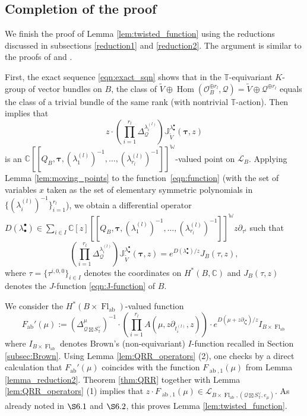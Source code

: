 \documentclass[a4paper,12pt]{amsart}
\numberwithin{equation}{section}
\theoremstyle{definition}
\newcommand{\C}{\mathbb{C}}
\newcommand{\J}{\mathbb{J}}
\newcommand{\T}{\mathbb{T}}
\newcommand{\W}{\mathbb{W}}
\newcommand{\btau}{{\bm{\tau}}}
\newcommand{\cL}{\mathcal{L}}
\newcommand{\Fab}{F_{\operatorname{ab}}}
\newcommand{\FlT}{\operatorname{Fl}_{\operatorname{ab}}}
\begin{document}
\subsection{Completion of the proof}\label{subsec:finish}
We finish the proof of Lemma \ref{lem:twisted_function} using the reductions discussed in subsections \ref{reduction1} and \ref{reduction2}.
The argument is similar to the proofs of \cite[Theorem 3.3]{IK:quantum} and \cite[Theorem 5.1]{Koto:mirror}.

First, the exact sequence \eqref{eqn:exact_sqn} shows that in the $\T$-equivariant $K$-group of vector bundles on $B$, the class of $\widetilde{V} \oplus \operatorname{Hom}(\mathcal{O}_B^{\oplus r_l},\mathcal{Q})=\widetilde{V} \oplus \mathcal{Q}^{\oplus r_l}$ equals the class of a trivial bundle of the same rank (with nontrivial $\T$-action). Then \cite[Lemma 2.9]{Koto:mirror} implies that
\begin{equation}\label{eqn:function}
    z \cdot \left( \prod_{i=1}^{r_l} \Delta_{\mathcal{Q}}^{\lambda_i^{(l)}} \right) \J_{\widetilde{V}}^{\lambda_\bullet^\bullet}(\btau,z)
\end{equation}
is an $\C[\![Q_B,\btau,(\lambda^{(l)}_1)^{-1},\dots,(\lambda^{(l)}_{r_l})^{-1}]\!]^\W$-valued point on $\cL_B$.
Applying Lemma \ref{lem:moving_points} to the function~\eqref{eqn:function} (with the set of variables $x$ taken as the set of elementary symmetric polynomials in $\{(\lambda^{(l)}_i)^{-1}\}_{i=1}^{r_l}$), we obtain a differential operator $D(\lambda_\bullet^\bullet)\in\sum_{i\in I}\C[z][\![Q_B,\btau,(\lambda^{(l)}_1)^{-1},\dots,(\lambda^{(l)}_{r_l})^{-1}]\!]^\W z\partial_{\tau^i}$ such that
\[
\left( \prod_{i=1}^{r_l} \Delta_{\mathcal{Q}}^{\lambda_i^{(l)}} \right) \J_{\widetilde{V}}^{\lambda_\bullet^\bullet}(\btau,z) = e^{D(\lambda^\bullet_\bullet)/z}J_B(\tau,z),
\]
where $\tau=\{\tau^{i,0,0}\}_{i\in I}$ denotes the coordinates on $H^*(B,\C)$ and $J_B(\tau,z)$ denotes the $J$-function \eqref{eqn:J-function} of $B$.


We consider the $H^*(B\times\FlT)$-valued function 
\[\Fab'(\mu):=
\left(\Delta_{\mathcal{Q}\boxtimes S_\T^\vee}^\mu\right)^{-1} \cdot 
\left( \prod_{i=1}^{r_l}  {A(\mu,z\partial_{t^{(l)}_i},z)} \right) \cdot  e^{D(\mu+z\partial_{t_\bullet^\bullet})/z} I_{B\times\FlT} 
\]
where $I_{B\times\FlT}$ denotes Brown's (non-equivariant) $I$-function recalled in Section \ref{subsec:Brown}.
Using Lemma \ref{lem:QRR_operators} (2), one checks by a direct calculation that $\Fab'(\mu)$ coincides with the function $F_{\operatorname{ab},1}(\mu)$ from Lemma \ref{lemma_reduction2}. 
Theorem \ref{thm:QRR} together with Lemma \ref{lem:QRR_operators} (1) implies that $z\cdot F_{\operatorname{ab},1}(\mu)\in\cL_{B\times\FlT,(\mathcal{Q}\boxtimes S^\vee_\T,e_\mu)}$.
As already noted in $\S 6.1$ and $\S 6.2$, this proves Lemma \ref{lem:twisted_function}.





\end{document}
